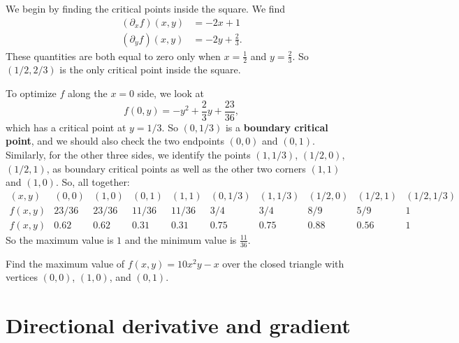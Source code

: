 \documentclass[svgnames]{watsonbook}
\begin{document}
  \begin{solution}
    We begin by finding the critical points inside the square. We find
    \begin{align*}
      (\partial_xf)(x,y) &= -2x + 1  \\
      (\partial_yf)(x,y) &= -2y + \frac{2}{3}. 
    \end{align*}
    These quantities are both equal to zero only when $x =
    \tfrac{1}{2}$ and $y = \frac{2}{3}$. So $(1/2,2/3)$ is the only critical
    point inside the square.

    To optimize $f$ along the $x = 0$ side, we look at
    \[
      f(0,y) = -y^2 + \frac{2}{3}y + \frac{23}{36}, 
    \]
    which has a critical point at $y = 1/3$. So $(0,1/3)$ is a
    \textbf{boundary critical point}, and we should also check the two
    endpoints $(0,0)$ and $(0,1)$. Similarly, for the other three
    sides, we identify the points $(1,1/3)$, $(1/2,0)$, $(1/2,1)$, as
    boundary critical points as well as the other two corners $(1,1)$
    and $(1,0)$. So, all together:
    \[
      \renewcommand\arraystretch{1.4}
      \begin{array}{c|ccccccccc}
       (x,y) &  (0,0) & (1,0) & (0,1) & (1,1) & (0,1/3) & (1,1/3) & (1/2,0) &
                                                                      (1/2,1)
        & (1/2,1/3) \\ \hline
        f(x,y) & 23/36 & 23/36 & 11/36 & 11/36 & 3/4 & 3/4 & 8/9 & 5/9
        & 1 \\
        f(x,y) & 0.62 & 0.62 & 0.31 & 0.31 & 0.75 & 0.75 & 0.88 & 0.56
        & 1
      \end{array}
    \]
    So the maximum value is $\boxed{1}$ and the minimum value is
    $\boxed{\tfrac{11}{36}}$. 
  \end{solution}

  \begin{exercise}{}{}
    Find the maximum value of $f(x,y) = 10x^2y-x$ over the closed
    triangle with vertices $(0,0)$, $(1,0)$, and $(0,1)$.
  \end{exercise}
  
  \section{Directional derivative and gradient} \label{sec:dd_and_grad} 

\end{document}
